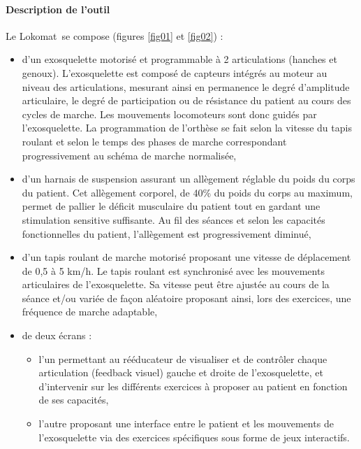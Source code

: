 \newpage

\paragraph{Description de l'outil}

Le Lokomat\textregistered\ se compose (figures \ref{fig01} et \ref{fig02}) :
\begin{itemize}
 \item d'un exosquelette motorisé et programmable à 2 articulations (hanches et genoux). L'exosquelette est composé de capteurs intégrés au moteur au niveau des articulations, mesurant ainsi en permanence le degré d'amplitude articulaire, le degré de participation ou de résistance du patient au cours des cycles de marche. Les mouvements locomoteurs sont donc guidés par l'exosquelette. La programmation de l'orthèse se fait selon la vitesse du tapis roulant
et selon le temps des phases de marche correspondant progressivement au schéma de marche normalisée,
\item d'un harnais de suspension assurant un allègement réglable du poids du corps du patient. Cet allègement corporel, de 40\% du poids du corps au maximum, permet de pallier le déficit musculaire du patient tout en gardant une stimulation sensitive suffisante. Au fil des séances et selon les capacités fonctionnelles du patient, l'allègement est progressivement diminué,
 \item d'un tapis roulant de marche motorisé proposant une vitesse de déplacement de 0,5 à 5 km/h. Le tapis roulant est synchronisé avec les mouvements articulaires de l'exosquelette. Sa vitesse peut être ajustée au cours de la séance et/ou variée de façon aléatoire proposant ainsi, lors des
exercices, une fréquence de marche adaptable,
 \item de deux écrans :
 \begin{itemize}
  \item l'un permettant au rééducateur de visualiser et de contrôler chaque articulation (feedback visuel) gauche et droite de l'exosquelette, et d'intervenir sur les différents exercices à proposer au patient en fonction de ses capacités,
  \item l'autre proposant une interface entre le patient et les mouvements de l'exosquelette via des exercices spécifiques sous forme de jeux interactifs.
 \end{itemize}
\end{itemize}

